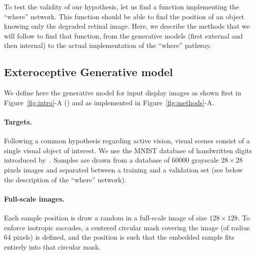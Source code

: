 
\fi
To test the validity of our hypothesis, let us find a %
function implementing the ``where'' network. This function should be able to find the position of an object knowing only the degraded retinal image. Here, we describe the methods that we will follow to find that function, from the generative models (first external and then internal) to the actual implementation of the ``where'' pathway. %



%
\subsection{Exteroceptive Generative model}
We define here the generative model for input display images as shown first in Figure~\ref{fig:intro}-A (\DIS ) and as implemented in Figure~\ref{fig:methods}-A.

\paragraph{Targets.} Following a common hypothesis regarding active vision, visual scenes consist of a single visual object of interest. We use the MNIST database of handwritten digits introduced by~\citep{Lecun1998}. %
Samples are drawn from a database of $60000$ grayscale $28\times 28$ pixels images and separated between a training and a validation set (see below the description of the ``where'' network).

\paragraph{Full-scale images.} Each sample position is draw a random in a full-scale image of size $128\times 128$. To enforce isotropic saccades, a centered circular mask covering the image (of radius $64$ pixels) is defined, and the position is such that the embedded sample fits entirely into that circular mask.

